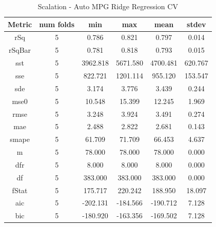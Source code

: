 \documentclass{article}
\begin{document}
\begin{table}[H]
\centering
\caption{Scalation - Auto MPG Ridge Regression CV}
\label{tab:Scalation - Auto MPG Ridge Regression CV}
\begin{tabular}{|c|c|c|c|c|c|}\hline
Metric & num folds & min & max & mean & stdev \\ \hline \hline
rSq & 5 & 0.786 & 0.821 & 0.797 & 0.014 \\ \hline
rSqBar & 5 & 0.781 & 0.818 & 0.793 & 0.015 \\ \hline
sst & 5 & 3962.818 & 5671.580 & 4700.481 & 620.767 \\ \hline
sse & 5 & 822.721 & 1201.114 & 955.120 & 153.547 \\ \hline
sde & 5 & 3.174 & 3.776 & 3.439 & 0.244 \\ \hline
mse0 & 5 & 10.548 & 15.399 & 12.245 & 1.969 \\ \hline
rmse & 5 & 3.248 & 3.924 & 3.491 & 0.274 \\ \hline
mae & 5 & 2.488 & 2.822 & 2.681 & 0.143 \\ \hline
smape & 5 & 61.709 & 71.709 & 66.453 & 4.637 \\ \hline
m & 5 & 78.000 & 78.000 & 78.000 & 0.000 \\ \hline
dfr & 5 & 8.000 & 8.000 & 8.000 & 0.000 \\ \hline
df & 5 & 383.000 & 383.000 & 383.000 & 0.000 \\ \hline
fStat & 5 & 175.717 & 220.242 & 188.950 & 18.097 \\ \hline
aic & 5 & -202.131 & -184.566 & -190.712 & 7.128 \\ \hline
bic & 5 & -180.920 & -163.356 & -169.502 & 7.128 \\ \hline
\end{tabular}
\end{table}
\end{document}
